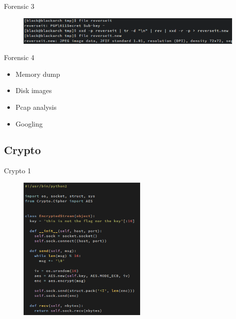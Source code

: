 \documentclass[compress]{beamer}
\begin{document}
\begin{frame}{Forensic 3}
	\begin{figure}
		\centering
		\includegraphics[width=\textwidth]{images/f24.png}
	\end{figure}    
\end{frame}

\begin{frame}{Forensic 4}

\begin{itemize}
	\item Memory dump
    \item Disk images
    \item Pcap analysis
    \item Googling
\end{itemize}

\end{frame}

\subsection{Crypto}

\begin{frame}{Crypto 1}
	\begin{figure}
		\centering
		\includegraphics[height=2.8in]{images/c12.png}
	\end{figure}
\end{frame}
\end{document}
